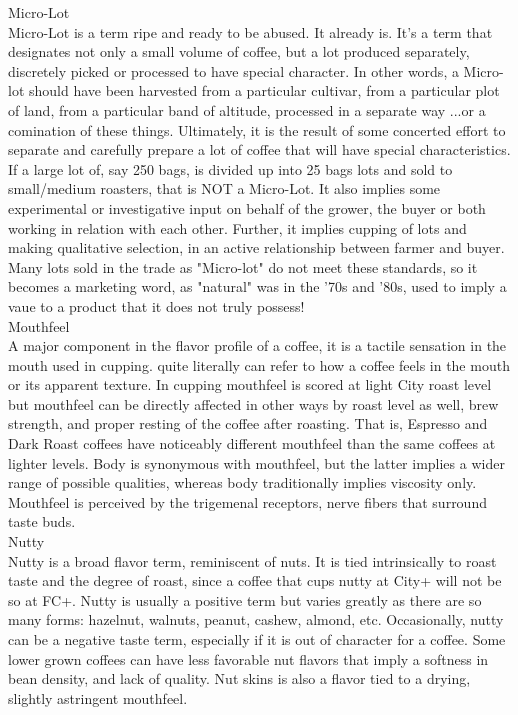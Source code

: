 \documentclass[10pt,twoside,footinclude=true,headinclude=true]{scrbook} %
\begin{document}
\begin{multicols}{2}
\medskip
{\smallcaps \small Micro-Lot}\\
Micro-Lot is a term ripe and ready to be abused. It already is. It's a term that designates not only a small volume of coffee, but a lot produced separately, discretely picked or processed to have special character. In other words, a Micro-lot should have been harvested from a particular cultivar, from a particular plot of land, from a particular band of altitude, processed in a separate way ...or a comination of these things. Ultimately, it is the result of some concerted effort to separate and carefully prepare a lot of coffee that will have special characteristics. If a large lot of, say 250 bags, is divided up into 25 bags lots and sold to small/medium roasters, that is NOT a Micro-Lot. It also implies some experimental or investigative input on behalf of the grower, the buyer or both working in relation with each other. Further, it implies cupping of lots and making qualitative selection, in an active relationship between farmer and buyer. Many lots sold in the trade as "Micro-lot" do not meet these standards, so it becomes a marketing word, as "natural" was in the '70s and '80s, used to imply a vaue to a product that it does not truly possess!\\
\medskip
{\smallcaps \small Mouthfeel}\\
A major component in the flavor profile of a coffee, it is a tactile sensation in the mouth used in cupping. quite literally can refer to how a coffee feels in the mouth or its apparent texture. In cupping mouthfeel is scored at light City roast level but mouthfeel can be directly affected in other ways by roast level as well, brew strength, and proper resting of the coffee after roasting. That is, Espresso and Dark Roast coffees have noticeably different mouthfeel than the same coffees at lighter levels. Body is synonymous with mouthfeel, but the latter implies a wider range of possible qualities, whereas body traditionally implies viscosity only. Mouthfeel is perceived by the trigemenal receptors, nerve fibers that surround taste buds.\\
\medskip
{\smallcaps \small Nutty}\\
Nutty is a broad flavor term, reminiscent of nuts. It is tied intrinsically to roast taste and the degree of roast, since a coffee that cups nutty at City+ will not be so at FC+. Nutty is usually a positive term but varies greatly as there are so many forms: hazelnut, walnuts, peanut, cashew, almond, etc. Occasionally, nutty can be a negative taste term, especially if it is out of character for a coffee. Some lower grown coffees can have less favorable nut flavors that imply a softness in bean density, and lack of quality. Nut skins is also a flavor tied to a drying, slightly astringent mouthfeel.\\

\end{multicols}
\end{document}

